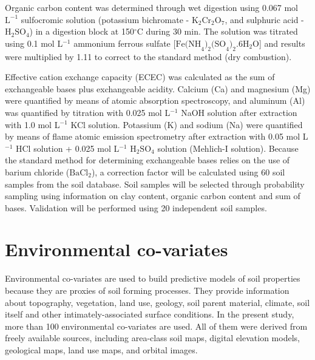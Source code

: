 Organic carbon content was determined through wet digestion using 0.067 mol $\text{L}^{-1}$ sulfocromic solution (potassium bichromate - $\text{K}_{2}\text{Cr}_{2}\text{O}_{7}$, and sulphuric acid - $\text{H}_{2}\text{SO}_{4}$) in a digestion block at 150$^{\circ}$C during 30 min. The solution was titrated using 0.1 mol L$^{-1}$ ammonium ferrous sulfate {[}$\text{Fe(NH}_{4}\text{)}_{2}\text{(SO}_{4}\text{)}_{2}\text{.6H}_{2}\text{O}${]} and results were multiplied by 1.11 to correct to the standard method (dry combustion).%

Effective cation exchange capacity (ECEC) was calculated as the sum of exchangeable bases plus exchangeable acidity. Calcium (Ca) and magnesium (Mg) were quantified by means of atomic absorption spectroscopy, and aluminum (Al) was quantified by titration with 0.025 mol L$^{-1}$ NaOH solution after extraction with 1.0 mol L$^{-1}$ KCl solution. Potassium (K) and sodium (Na) were quantified by means of flame atomic emission spectrometry after extraction with 0.05 mol L$^{-1}$ HCl solution + 0.025 mol L$^{-1}$ $\text{H}_{2}\text{SO}_{4}$ solution (Mehlich-I solution). Because the standard method for determining exchangeable bases relies on the use of barium chloride ($\text{BaCl}_{2}$), a correction factor will be calculated using 60 soil samples from the soil database. Soil samples will be selected through probability sampling using information on clay content, organic carbon content and sum of bases. Validation will be performed using 20 independent soil samples.

\tocless\section{Environmental co-variates}

Environmental co-variates are used to build predictive models of soil properties because they are proxies of soil forming processes. They provide information about topography, vegetation, land use, geology, soil parent material, climate, soil itself and other intimately-associated surface conditions. In the present study, more than 100 environmental co-variates are used. All of them were derived from freely available sources, including area-class soil maps, digital elevation models, geological maps, land use maps, and orbital images.

